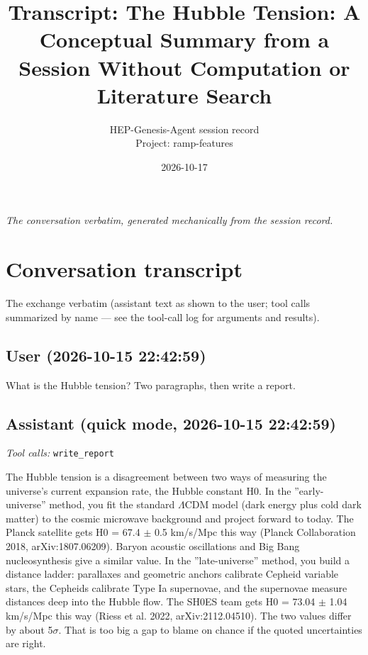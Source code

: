 \documentclass[11pt,a4paper]{article}
\title{Transcript: The Hubble Tension: A Conceptual Summary from a Session Without Computation or Literature Search}
\author{HEP-Genesis-Agent session record \\ \small Project: ramp-features}
\date{2026-10-17}
\begin{document}
\maketitle
\noindent\textit{\small The conversation verbatim, generated mechanically from the session record.}
\vspace{1em}



\appendix
\section{Conversation transcript}
\label{app:transcript}
The exchange verbatim (assistant text as shown to the user; tool calls summarized by name --- see the tool-call log for arguments and results).
\subsection*{User \small(2026-10-15 22:42:59)}
What is the Hubble tension? Two paragraphs, then write a report.

\subsection*{Assistant \small(quick mode, 2026-10-15 22:42:59)}
\textit{Tool calls:} \texttt{write\_report}\par
The Hubble tension is a disagreement between two ways of measuring the universe's current expansion rate, the Hubble constant H0. In the ''early-universe'' method, you fit the standard $\Lambda$CDM model (dark energy plus cold dark matter) to the cosmic microwave background and project forward to today. The Planck satellite gets H0 = 67.4 $\pm$ 0.5 km/s/Mpc this way (Planck Collaboration 2018, arXiv:1807.06209). Baryon acoustic oscillations and Big Bang nucleosynthesis give a similar value. In the ''late-universe'' method, you build a distance ladder: parallaxes and geometric anchors calibrate Cepheid variable stars, the Cepheids calibrate Type Ia supernovae, and the supernovae measure distances deep into the Hubble flow. The SH0ES team gets H0 = 73.04 $\pm$ 1.04 km/s/Mpc this way (Riess et al. 2022, arXiv:2112.04510). The two values differ by about 5$\sigma$. That is too big a gap to blame on chance if the quoted uncertainties are right.
\end{document}
